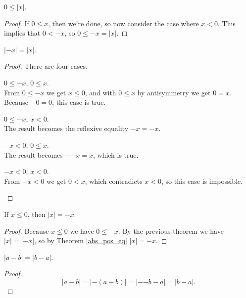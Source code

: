 \documentclass[../math.tex]{subfiles}
\begin{document}
\begin{theorem}
    $0 \leq |x|$.
\end{theorem}
\begin{proof}
    If $0 \leq x$, then we're done, so now consider the case where $x < 0$.
    This implies that $0 < -x$, so $0 \leq -x = |x|$.
\end{proof}

\begin{theorem}
    $|{-x}| = |x|$.
\end{theorem}
\begin{proof}
    There are four cases.
    \begin{case} $0 \leq -x$, $0 \leq x$. \\
        From $0 \leq -x$ we get $x \leq 0$, and with $0 \leq x$ by antisymmetry
        we get $0 = x$.  Because $-0 = 0$, this case is true.
    \end{case}
    \begin{case} $0 \leq -x$, $x < 0$. \\
        The result becomes the reflexive equality $-x = -x$.
    \end{case}
    \begin{case} $-x < 0$, $0 \leq x$. \\
        The result becomes $-{-x} = x$, which is true.
    \end{case}
    \begin{case} $-x < 0$, $x < 0$. \\
        From $-x < 0$ we get $0 < x$, which contradicts $x < 0$, so this case is
        impossible.
    \end{case}
\end{proof}

\begin{theorem}
    If $x \leq 0$, then $|x| = -x$.
\end{theorem}
\begin{proof}
    Because $x \leq 0$ we have $0 \leq -x$.  By the previous theorem we have
    $|x| = |{-x}|$, so by Theorem \ref{abs_pos_eq} $|x| = -x$.
\end{proof}

\begin{theorem}
    $|a - b| = |b - a|$.
\end{theorem}
\begin{proof}
    \[
        |a - b| = |{-(a - b)}| = |{-{-b}} - a| = |b - a|.
    \]
\end{proof}
\end{document}

